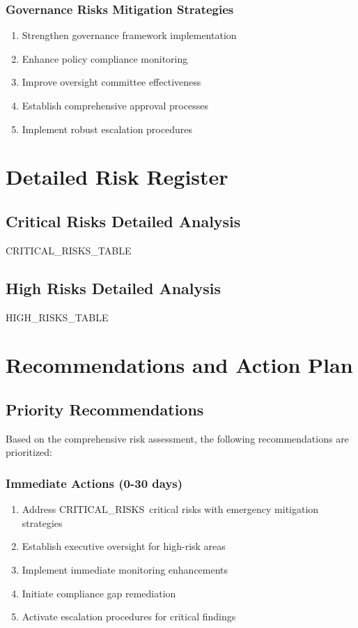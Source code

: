 \documentclass[11pt,a4paper]{article}
\newcommand{\criticalrisks}{{{CRITICAL_RISKS}}}
\begin{document}
\subsubsection{Governance Risks Mitigation Strategies}
\begin{enumerate}
\item Strengthen governance framework implementation
\item Enhance policy compliance monitoring
\item Improve oversight committee effectiveness
\item Establish comprehensive approval processes
\item Implement robust escalation procedures
\end{enumerate}

\newpage

\section{Detailed Risk Register}

\subsection{Critical Risks Detailed Analysis}

{{CRITICAL_RISKS_TABLE}}

\subsection{High Risks Detailed Analysis}

{{HIGH_RISKS_TABLE}}

\newpage

\section{Recommendations and Action Plan}

\subsection{Priority Recommendations}

Based on the comprehensive risk assessment, the following recommendations are prioritized:

\subsubsection{Immediate Actions (0-30 days)}
\begin{enumerate}
\item Address \criticalrisks\ critical risks with emergency mitigation strategies
\item Establish executive oversight for high-risk areas
\item Implement immediate monitoring enhancements
\item Initiate compliance gap remediation
\item Activate escalation procedures for critical findings
\end{enumerate}
\end{document}
